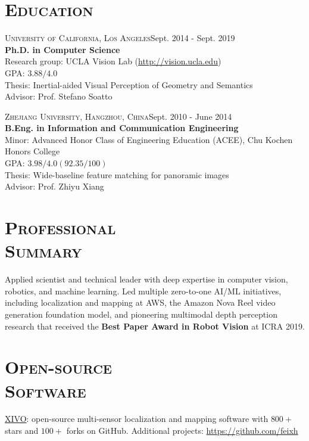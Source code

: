 \documentclass[margin, line]{res} %
\begin{document}
\begin{resume}

\section{\textsc{Education}}
\textsc{University of California, Los Angeles}\hfill{Sept. 2014 - Sept. 2019}\\
{\bf Ph.D. in Computer Science}\\
Research group: UCLA Vision Lab (\url{http://vision.ucla.edu})\\
GPA: $3.88/4.0$ \\
Thesis: Inertial-aided Visual Perception of Geometry and Semantics \\
Advisor: Prof. Stefano Soatto

\textsc{Zhejiang University, Hangzhou, China}\hfill{Sept. 2010 - June 2014}\\
{\bf B.Eng. in Information and Communication Engineering}\\
Minor: Advanced Honor Class of Engineering Education (ACEE), Chu Kochen Honors College\\
GPA: $3.98/4.0 (92.35/100)$ \\
Thesis: Wide-baseline feature matching for panoramic images\\
Advisor: Prof. Zhiyu Xiang\\

\section{\textsc{Professional\\Summary}}
Applied scientist and technical leader with deep expertise in computer vision, robotics, and machine learning. Led multiple zero-to-one AI/ML initiatives, including localization and mapping at AWS, the Amazon Nova Reel video generation foundation model, and pioneering multimodal depth perception research that received the {\bf Best Paper Award in Robot Vision} at ICRA 2019.

\section{\textsc{Open-source\\Software}}
\href{https://github.com/ucla-vision/xivo}{XIVO}: open-source multi-sensor localization and mapping software with $800+$ stars and $100+$ forks on GitHub.
Additional projects: \url{https://github.com/feixh}


\end{resume}
\end{document}
